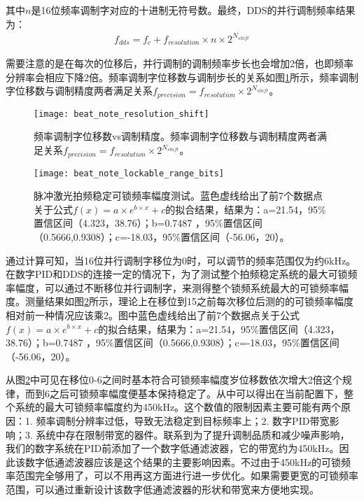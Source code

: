 其中$n$是16位频率调制字对应的十进制无符号数。最终，DDS的并行调制频率结果为：
\begin{align}
    f_{dds}=f_c+f_{resolution}\times n \times 2^{N_{shift}}
\end{align}

需要注意的是在每次的位移后，并行调制的调制频率步长也会增加2倍，也即频率分辨率会相应下降2倍。频率调制字位移数与调制步长的关系如图\ref{fig:beat_note_resolution_shift}所示，频率调制字位移数与调制精度两者满足关系$f_{precision}=f_{resolution}\times2^{N_{shift}}$。

\begin{figure}
    \centering
    \caption[频率调制字位移数vs调制精度
    ]{频率调制字位移数vs调制精度。频率调制字位移数与调制精度两者满足关系$f_{precision}=f_{resolution}\times2^{N_{shift}}$。
    \label{fig:beat_note_resolution_shift}}
    \texttt{[image: beat\_note\_resolution\_shift]}
\end{figure}


\begin{figure}
    \centering
    \caption[脉冲激光拍频稳定可锁频率幅度测试]{脉冲激光拍频稳定可锁频率幅度测试。蓝色虚线给出了前7个数据点关于公式$f(x)=a\times e^{b\times x}+c$的拟合结果，结果为：a=21.54，95\%置信区间（4.323，38.76）；b=0.7487 ，95\%置信区间（0.5666,0.9308）；c=-18.03，95\%置信区间（-56.06，20）。\label{fig:beat_note_lockable_range_bits}}
    \texttt{[image: beat\_note\_lockable\_range\_bits]}
\end{figure}

通过计算可知，当16位并行调制字移位为0时，可以调节的频率范围仅为约6kHz。在数字PID和DDS的连接一定的情况下，为了测试整个拍频稳定系统的最大可锁频率幅度，可以通过不断移位并行调制字，来测得整个锁频系统最大的可锁频率幅度。测量结果如图\ref{fig:beat_note_lockable_range_bits}所示，理论上在移位到15之前每次移位后测的的可锁频率幅度相对前一种情况应该乘2。图中蓝色虚线给出了前7个数据点关于公式$f(x)=a\times e^{b\times x}+c$的拟合结果，结果为：a=21.54，95\%置信区间（4.323，38.76）；b=0.7487 ，95\%置信区间（0.5666,0.9308）；c=-18.03，95\%置信区间（-56.06，20）。

从图\ref{fig:beat_note_lockable_range_bits}中可见在移位0-6之间时基本符合可锁频率幅度岁位移数依次增大2倍这个规律，而到6之后可锁频率幅度便基本保持稳定了。从中可以得出在当前配置下，整个系统的最大可锁频率幅度约为450kHz。这个数值的限制因素主要可能有两个原因：1. 频率调制分辨率过低，导致无法稳定到目标频率上；2. 数字PID带宽影响；3. 系统中存在限制带宽的器件。联系到为了提升调制品质和减少噪声影响，我们的数字系统在PID前添加了一个数字低通滤波器，它的带宽约为450kHz。因此该数字低通滤波器应该是这个结果的主要影响因素。不过由于450kHz的可锁频率范围完全够用了，可以不用再这方面进行进一步优化。如果需要更宽的可锁频率范围，可以通过重新设计该数字低通滤波器的形状和带宽来方便地实现。

